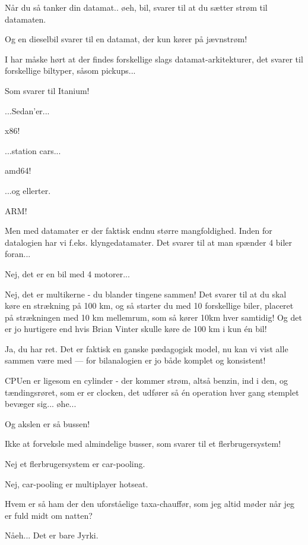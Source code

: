 \documentclass[a4paper,11pt]{article}
\begin{document}
\begin{sketch}
   Når du så tanker din datamat.. øeh, bil, svarer til at du
  sætter strøm til datamaten.

   Og en dieselbil svarer til en datamat, der kun kører på
  jævnstrøm!

   I har måske hørt at der findes forskellige slags
  datamat-arkitekturer, det svarer til forskellige biltyper, såsom
  pickups...

   Som svarer til Itanium!

   ...Sedan'er...

   x86!

   ...station cars...

   amd64!

   ...og ellerter.

   ARM! 

   Men med datamater er der faktisk endnu større
  mangfoldighed. Inden for datalogien har vi
  f.eks. klyngedatamater. Det svarer til at man spænder 4 biler
  foran...

   Nej, det er en bil med 4 motorer...

   Nej, det er multikerne - du blander tingene sammen! Det
  svarer til at du skal køre en strækning på 100 km, og så starter du
  med 10 forskellige biler, placeret på strækningen med 10 km
  mellemrum, som så kører 10km hver samtidig!  Og det er jo hurtigere
  end hvis Brian Vinter skulle køre de 100 km i kun én bil!

   Ja, du har ret. Det er faktisk en ganske pædagogisk model,  nu kan vi vist alle sammen være med --- for bilanalogien er jo både komplet og konsistent!

   CPUen er ligesom en cylinder - der kommer strøm, altså
  benzin, ind i den, og tændingsrøret, som er er clocken, det udfører
  så én operation hver gang stemplet bevæger sig... øhe...

   Og akslen er så bussen!

   Ikke at forveksle med almindelige busser, som svarer til
  et flerbrugersystem!

   Nej et flerbrugersystem er car-pooling.

   Nej, car-pooling er multiplayer hotseat.

   Hvem er så ham der den uforståelige taxa-chauffør, som jeg
  altid møder når jeg er fuld midt om natten?

   Nåeh... Det er bare Jyrki.


\end{sketch}
\end{document}
